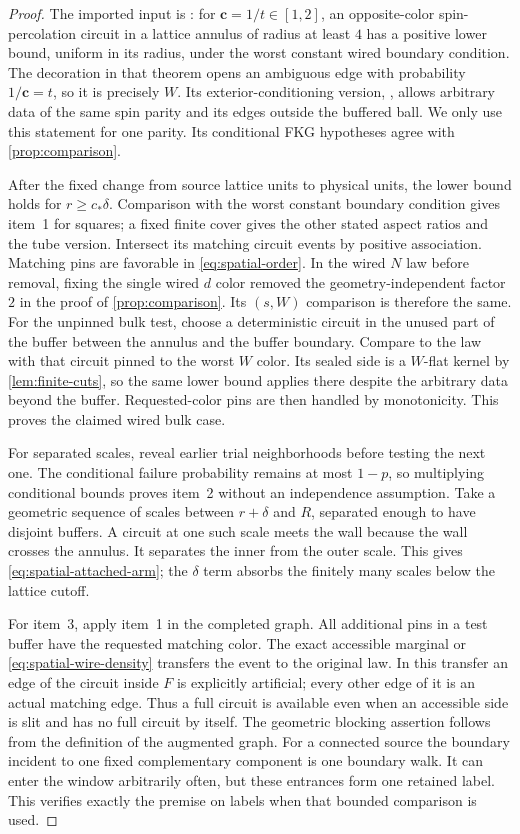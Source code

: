 \begin{proof}
The imported input is \cite[Theorem~16.4]{DKLM2026}: for
$\mathbf c=1/t\in[1,2]$, an opposite-color spin-percolation circuit in
a lattice annulus of radius at least $4$ has a positive lower bound,
uniform in its radius, under the worst constant wired boundary
condition. The decoration in that theorem opens an ambiguous edge
with probability $1/\mathbf c=t$, so it is precisely $W$. Its
exterior-conditioning version, \cite[Corollary~16.6]{DKLM2026},
allows arbitrary data of the same spin parity and its edges outside
the buffered ball. We only use this statement for one parity. Its
conditional FKG hypotheses agree with \cref{prop:comparison}.

After the fixed change from source lattice units to physical units,
the lower bound holds for $r\ge c_*\delta$. Comparison with the worst
constant boundary condition gives item~1 for squares; a fixed finite
cover gives the other stated aspect ratios and the tube version.
Intersect its matching circuit events by positive association.
Matching pins are favorable in \eqref{eq:spatial-order}. In the
wired $N$ law before removal, fixing the single wired $d$ color removed
the geometry-independent factor $2$ in the proof of
\cref{prop:comparison}. Its $(s,W)$ comparison is therefore the same.
For the unpinned bulk test, choose a deterministic circuit in the
unused part of the buffer between the annulus and the buffer boundary.
Compare to the law with that circuit pinned to the worst $W$ color.
Its sealed side is a $W$-flat kernel by \cref{lem:finite-cuts}, so
the same lower bound applies there despite the arbitrary data beyond
the buffer. Requested-color pins are then handled by monotonicity.
This proves the claimed wired bulk case.

For separated scales, reveal earlier trial neighborhoods before
testing the next one. The conditional failure probability remains
at most $1-p$, so multiplying conditional bounds proves item~2
without an independence assumption. Take a geometric sequence of
scales between $r+\delta$ and $R$, separated enough to have disjoint
buffers. A circuit at one such scale meets the wall because the wall
crosses the annulus. It separates the inner from the outer scale.
This gives \eqref{eq:spatial-attached-arm}; the $\delta$ term absorbs
the finitely many scales below the lattice cutoff.

For item~3, apply item~1 in the completed graph. All additional pins
in a test buffer have the requested matching color. The exact
accessible marginal or \eqref{eq:spatial-wire-density} transfers the
event to the original law. In this transfer an edge of the circuit
inside $F$ is explicitly artificial; every other edge of it is an
actual matching edge. Thus a full circuit is available even when an
accessible side is slit and has no full circuit by itself. The
geometric blocking assertion follows from the definition of the
augmented graph. For a connected source the boundary incident to one
fixed complementary component is one boundary walk. It can enter the
window arbitrarily often, but these entrances form one retained label.
This verifies exactly the premise on labels when that bounded
comparison is used.
\end{proof}

